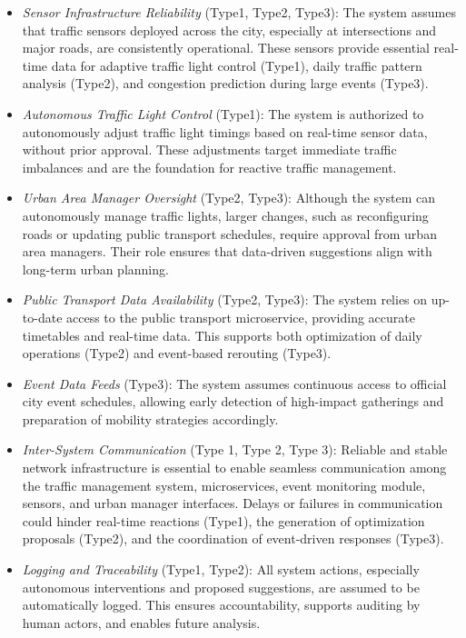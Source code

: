 \documentclass[a4paper,12pt]{article}
\begin{document}
\begin{itemize}

    \item \textit{Sensor Infrastructure Reliability} (Type1, Type2, Type3): The system assumes that traffic sensors deployed across the city, especially at intersections and major roads, are consistently operational. These sensors provide essential real-time data for adaptive traffic light control (Type1), daily traffic pattern analysis (Type2), and congestion prediction during large events (Type3).

    \item \textit{Autonomous Traffic Light Control} (Type1): The system is authorized to autonomously adjust traffic light timings based on real-time sensor data, without prior approval. These adjustments target immediate traffic imbalances and are the foundation for reactive traffic management.

    \item \textit{Urban Area Manager Oversight} (Type2, Type3): Although the system can autonomously manage traffic lights, larger changes, such as reconfiguring roads or updating public transport schedules, require approval from urban area managers. Their role ensures that data-driven suggestions align with long-term urban planning.

    \item \textit{Public Transport Data Availability} (Type2, Type3): The system relies on up-to-date access to the public transport microservice, providing accurate timetables and real-time data. This supports both optimization of daily operations (Type2) and event-based rerouting (Type3).

    \item \textit{Event Data Feeds} (Type3): The system assumes continuous access to official city event schedules, allowing early detection of high-impact gatherings and preparation of mobility strategies accordingly.

    \item \textit{Inter-System Communication} (Type 1, Type 2, Type 3): Reliable and stable network infrastructure is essential to enable seamless communication among the traffic management system, microservices, event monitoring module, sensors, and urban manager interfaces. Delays or failures in communication could hinder real-time reactions (Type1), the generation of optimization proposals (Type2), and the coordination of event-driven responses (Type3).

    \item \textit{Logging and Traceability} (Type1, Type2): All system actions, especially autonomous interventions and proposed suggestions, are assumed to be automatically logged. This ensures accountability, supports auditing by human actors, and enables future analysis.


\end{itemize}
\end{document}
